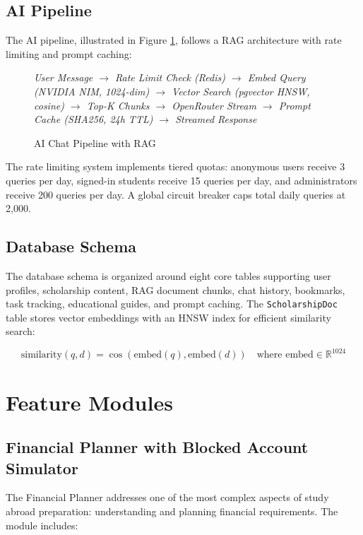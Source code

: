 \documentclass[conference]{IEEEtran}
\begin{document}
\subsection{AI Pipeline}

The AI pipeline, illustrated in Figure \ref{fig:pipeline}, follows a RAG architecture with rate limiting and prompt caching:

\begin{figure}[h]
\centering
\textit{
User Message $\rightarrow$ Rate Limit Check (Redis) $\rightarrow$ Embed Query (NVIDIA NIM, 1024-dim) $\rightarrow$ Vector Search (pgvector HNSW, cosine) $\rightarrow$ Top-K Chunks $\rightarrow$ OpenRouter Stream $\rightarrow$ Prompt Cache (SHA256, 24h TTL) $\rightarrow$ Streamed Response
}
\caption{AI Chat Pipeline with RAG}
\label{fig:pipeline}
\end{figure}

The rate limiting system implements tiered quotas: anonymous users receive 3 queries per day, signed-in students receive 15 queries per day, and administrators receive 200 queries per day. A global circuit breaker caps total daily queries at 2,000.

\subsection{Database Schema}

The database schema is organized around eight core tables supporting user profiles, scholarship content, RAG document chunks, chat history, bookmarks, task tracking, educational guides, and prompt caching. The \texttt{ScholarshipDoc} table stores vector embeddings with an HNSW index for efficient similarity search:

\begin{equation}
\text{similarity}(q, d) = \cos(\text{embed}(q), \text{embed}(d)) \quad \text{where } \text{embed} \in \mathbb{R}^{1024}
\end{equation}

\section{Feature Modules}
\label{sec:features}

\subsection{Financial Planner with Blocked Account Simulator}

The Financial Planner addresses one of the most complex aspects of study abroad preparation: understanding and planning financial requirements. The module includes:
\end{document}
